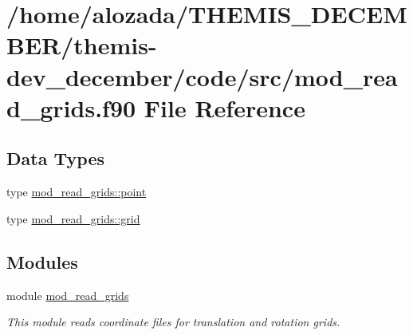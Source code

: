\hypertarget{mod__read__grids_8f90}{}\section{/home/alozada/\+T\+H\+E\+M\+I\+S\+\_\+\+D\+E\+C\+E\+M\+B\+E\+R/themis-\/dev\+\_\+december/code/src/mod\+\_\+read\+\_\+grids.f90 File Reference}
\label{mod__read__grids_8f90}
\subsection*{Data Types}
\begin{DoxyCompactItemize}
\item 
type \hyperlink{structmod__read__grids_1_1point}{mod\+\_\+read\+\_\+grids\+::point}
\item 
type \hyperlink{structmod__read__grids_1_1grid}{mod\+\_\+read\+\_\+grids\+::grid}
\end{DoxyCompactItemize}
\subsection*{Modules}
\begin{DoxyCompactItemize}
\item 
module \hyperlink{namespacemod__read__grids}{mod\+\_\+read\+\_\+grids}
\begin{DoxyCompactList}\small\item\em This module reads coordinate files for translation and rotation grids. \end{DoxyCompactList}\end{DoxyCompactItemize}
